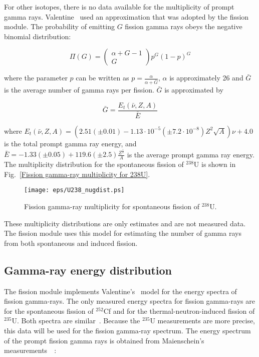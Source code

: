 \documentclass[11pt]{article}
\begin{document}
For other isotopes, there is no data available for the multiplicity of
prompt gamma rays.  Valentine~\cite{Valentine 2001} used an
approximation that was adopted by the fission module.  The probability
of emitting $G$ fission gamma rays obeys the negative binomial
distribution:

\begin{equation}
\Pi(G)=\left(\begin{array}{c} \alpha+G-1 \\ G \end{array} \right) p^G(1-p)^G
\end{equation}

where the parameter $p$ can be written as
$p=\frac{\alpha}{\alpha+\bar{G}}$, $\alpha$ is approximately 26 and
$\bar{G}$ is the average number of gamma rays per fission.  $\bar{G}$
is approximated by

\begin{equation}
\bar{G} = \frac{E_t(\bar{\nu}, Z, A)}{\bar{E}}
\end{equation}

where $E_t(\bar{\nu}, Z,
A)=(2.51(\pm0.01)-1.13\cdot10^{-5}(\pm7.2\cdot10^{-8})Z^2\sqrt{A})\nu+4.0$
is the total prompt gamma ray energy, and $\bar{E} =
-1.33(\pm0.05)+119.6(\pm2.5)\frac{Z^{\frac{1}{3}}}{A}$ is the average
prompt gamma ray energy.  The multiplicity distribution for the
spontaneous fission of $^{238}$U is shown in Fig.~\ref{Fission
gamma-ray multiplicity for 238U}.

\begin{figure}[ht]
\begin{center}
\texttt{[image: eps/U238\_nugdist.ps]}
\end{center}
\caption{Fission gamma-ray multiplicity for spontaneous fission of $^{238}$U.}
\label{Fission gamma-ray multiplicity for 238U}
\end{figure}

These multiplicity distributions are only estimates and are not
measured data.  The fission module uses this model for estimating the
number of gamma rays from both spontaneous and induced fission.

\subsection{Gamma-ray energy distribution}

The fission module implements Valentine's~\cite{Valentine 2000} model
for the energy spectra of fission gamma-rays.  The only measured
energy spectra for fission gamma-rays are for the spontaneous fission
of $^{252}$Cf and for the thermal-neutron-induced fission of $^{235}$U.
Both spectra are similar~\cite{Wagemans 1991}.  Because the $^{235}$U
measurements are more precise, this data will be used for the fission
gamma-ray spectrum.  The energy spectrum of the prompt fission gamma
rays is obtained from Maienschein's measurements~\cite{Maienschein
1958}~\cite{Goldstein 1959}:
\end{document}
